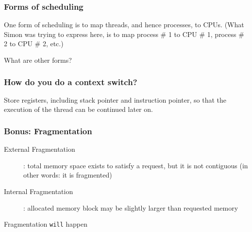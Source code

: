 
\subsubsection*{Forms of scheduling}
One form of scheduling is to map threads, and hence processes, to CPUs.
(What Simon was trying to express here, is to map process \# 1 to CPU \# 1, process \# 2 to CPU \# 2, etc.)

What are other forms?



\subsubsection*{How do you do a context switch?}
Store registers, including stack pointer and instruction pointer, so that the execution of the thread can be continued later on.

\subsubsection*{Bonus: Fragmentation}
\begin{description}
\item[External Fragmentation]: total memory space exists to satisfy a request, but it is not contiguous (in other words: it is fragmented)
\item[Internal Fragmentation]: allocated memory block may be slightly larger than requested memory
\end{description}
Fragmentation \texttt{will} happen